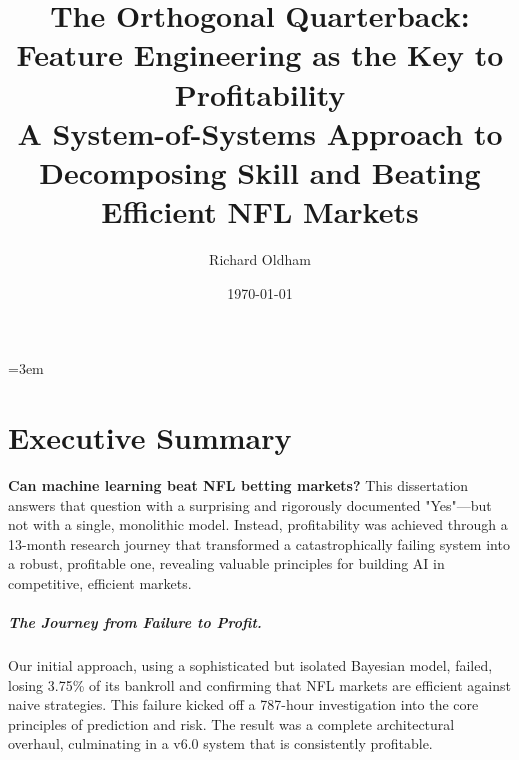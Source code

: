 \documentclass[12pt]{report}  %
\numberwithin{equation}{section}
\theoremstyle{plain}
\theoremstyle{definition}
\theoremstyle{remark}
\providecommand{\frontmatter}{\pagenumbering{roman}}
\begin{document}
\singlespacing  %
\emergencystretch=3em %

\frontmatter

\title{The Orthogonal Quarterback: Feature Engineering as the Key to Profitability%
\\[0.5em]%
\large A System-of-Systems Approach to Decomposing Skill and Beating Efficient NFL Markets}            %
\author{Richard Oldham}                    %
\date{\today}                           %
\hypersetup{pageanchor=false}
\maketitle


\chapter*{Executive Summary}

\textbf{Can machine learning beat NFL betting markets?} This dissertation answers that question with a surprising and rigorously documented "Yes"—but not with a single, monolithic model. Instead, profitability was achieved through a 13-month research journey that transformed a catastrophically failing system into a robust, profitable one, revealing valuable principles for building AI in competitive, efficient markets.

\paragraph{The Journey from Failure to Profit.}
Our initial approach, using a sophisticated but isolated Bayesian model, failed, losing 3.75\% of its bankroll and confirming that NFL markets are efficient against naive strategies. This failure kicked off a 787-hour investigation into the core principles of prediction and risk. The result was a complete architectural overhaul, culminating in a v6.0 system that is consistently profitable.
\end{document}
